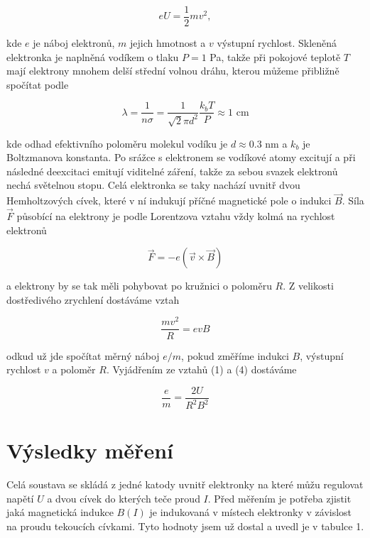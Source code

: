 \documentclass[a4paper,11pt]{article}
\begin{document}
\begin{equation}
e U = \frac{1}{2} m v^2,
\end{equation}

\noindent
kde $ e $  je náboj elektronů, $ m $  jejich hmotnost a $ v $ výstupní rychlost. Skleněná elektronka je naplněná vodíkem o tlaku $ P = 1 $ Pa, takže při pokojové teplotě $ T $ mají elektrony mnohem delší střední volnou dráhu, kterou můžeme přibližně spočítat podle 

\begin{equation}
\lambda = \frac{1}{n \sigma} = \frac{1}{ \sqrt{2}  \pi d^2}  \frac{k_b T}{P} \approx 1  \text{ cm}
\end{equation}

\noindent
kde odhad efektivního poloměru molekul vodíku je $ d \approx 0.3 $ nm a $ k_b $ je Boltzmanova konstanta. Po srážce s elektronem se vodíkové atomy excitují a při následné deexcitaci emitují viditelné záření, takže za sebou svazek elektronů nechá světelnou stopu. Celá elektronka se taky nachází uvnitř dvou Hemholtzových cívek, které v ní indukují příčné magnetické pole o indukci $ \vec{B} $. Síla $ \vec{F} $  působící na elektrony je podle Lorentzova vztahu vždy kolmá na rychlost elektronů 

\begin{equation}
\vec{F} = -e (\vec{v} \times \vec{B} )
\end{equation}

\noindent
a elektrony by se tak měli pohybovat po kružnici o poloměru $ R $. Z velikosti dostředivého zrychlení dostáváme vztah

\begin{equation}
\frac{ m v^2}{R} =  e v B
\end{equation}

\noindent
odkud už jde spočítat měrný náboj $ e / m $, pokud změříme indukci $ B $, výstupní rychlost $ v $ a poloměr $ R $. Vyjádřením ze vztahů (1) a (4) dostáváme 

\begin{equation}
\frac{e}{m} =  \frac{2 U}{ R^2 B^2} 
\end{equation}

\newpage

\section{Výsledky měření}

Celá soustava se skládá z jedné katody uvnitř elektronky na které můžu regulovat napětí $ U $ a dvou cívek do kterých teče proud $ I $. Před měřením je potřeba zjistit jaká magnetická indukce $ B(I) $ je indukovaná v místech elektronky v závislost na proudu tekoucích cívkami. Tyto hodnoty jsem už dostal a uvedl je v tabulce 1.
\end{document}
